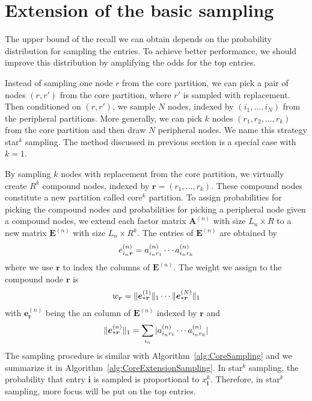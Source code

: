 \documentclass[letterpaper]{article}
\newcommand{\Sca}[3]{{#1}^{(#2)}_{i_#2#3}}%
\newcommand{\anr}[2]{\Sca{a}{#1}{#2}}
\newcommand{\V}[1]{{\boldsymbol{{\MakeLowercase{#1}}}}}
\newcommand{\VnC}[3]{\V{#1}^{(#2)}_{#3}}
\newcommand{\norm}[2]{\|#1\|_{#2}}
\newcommand{\Alg}[1] {Algorithm~\ref{alg:#1}}
\begin{document}
\section{Extension of the basic sampling}

The upper bound of the recall we can obtain 
depends on the probability distribution for sampling the entries. 
To achieve better performance, 
we should improve this distribution by amplifying the odds for the top entries.

Instead of sampling one node $r$ from the core partition, 
we can pick a pair of nodes $(r,r')$ from the core partition, 
where $r'$ is sampled with replacement. 
Then conditioned on $(r,r')$, we sample $N$ nodes, 
indexed by $(i_1,\ldots,i_N)$ from the peripheral partitions. 
More generally, we can pick $k$ nodes $(r_1,r_2,\ldots,r_k)$ from the core partition 
and then draw $N$ peripheral nodes. 
We name this strategy star$^k$ sampling. 
The method discussed in previous section is a special case with $k=1$.

By sampling $k$ nodes with replacement from the core partition, we virtually create $R^k$ compound nodes, indexed by $\boldsymbol{r}=(r_1,\ldots,r_k)$. These compound nodes constitute a new partition called core$^k$ partition. To assign probabilities for picking the compound nodes and probabilities for picking a peripheral node given a compound nodes, we extend each factor matrix $\textbf{A}^{(n)}$ with size $L_n\times R$ to a new matrix $\textbf{E}^{(n)}$ with size $L_n\times R^k$. The entries of $\textbf{E}^{(n)}$ are obtained by
\begin{align}
\Sca{e}{n}{\V{r}} = \anr{n}{r_1}\cdots\anr{n}{r_k}
\end{align}
where we use $\boldsymbol{r}$ to index the columns of $\textbf{E}^{(n)}$. The weight we assign to the compound node $\boldsymbol{r}$ is
\begin{align}
w_{\V{r}} = \norm{\VnC{e}{1}{*\V{r}}}{1}\cdots\norm{\VnC{e}{N}{*\V{r}}}{1}
\end{align}
with $\mathbf{e}_{\boldsymbol{r}}^{(n)}$ being the an column of $\textbf{E}^{(n)}$ indexed by $\boldsymbol{r}$ and
\begin{align}
\norm{\VnC{e}{n}{*\V{r}}}{1} = \sum_{i_n}|\anr{n}{r_1}\cdots\anr{n}{r_k}|
\end{align}
The sampling procedure is similar with \Alg{CoreSampling} and we summarize it in \Alg{CoreExtensionSampling}. 
In star$^k$ sampling, the probability that entry $\boldsymbol{i}$ is sampled is proportional to $x_{\boldsymbol{i}}^k$. Therefore, in star$^k$ sampling, more focus will be put on the top entries.
\end{document}
